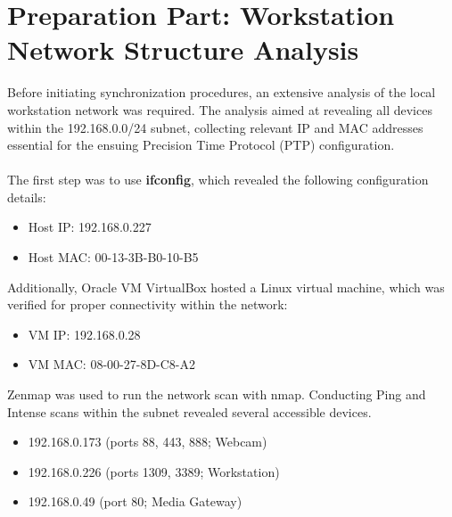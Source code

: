 \section{Preparation Part: Workstation Network Structure Analysis }
\label{sec:preparation}

Before initiating synchronization procedures, an extensive analysis of the local workstation network was required. The analysis aimed at revealing all devices within the 192.168.0.0/24 subnet, collecting relevant IP and MAC addresses essential for the ensuing Precision Time Protocol (PTP) configuration. \\\\
The first step was to use \textbf{ifconfig}, which revealed the following configuration details:
\begin{itemize}
\item  Host IP: 192.168.0.227
\item Host MAC: 00-13-3B-B0-10-B5
 \end{itemize}
Additionally, Oracle VM VirtualBox hosted a Linux virtual machine, which was verified for proper connectivity within the network:
\begin{itemize}
\item VM IP: 192.168.0.28
\item VM MAC: 08-00-27-8D-C8-A2
\end{itemize}
Zenmap was used to run the network scan with nmap. Conducting Ping and Intense scans within the subnet revealed several accessible devices.
\begin{itemize}
\item 192.168.0.173 (ports 88, 443, 888; Webcam)
\item 192.168.0.226 (ports 1309, 3389; Workstation)
\item 192.168.0.49 (port 80; Media Gateway)
\end{itemize}

